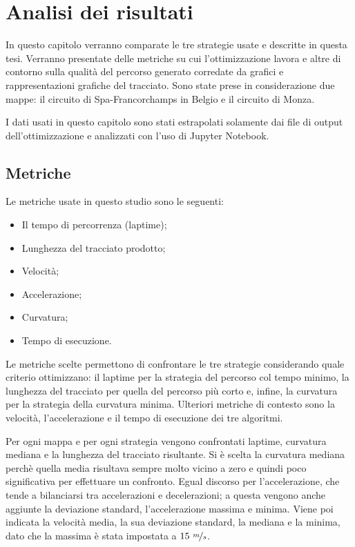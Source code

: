
\chapter{Analisi dei risultati}
In questo capitolo verranno comparate le tre strategie usate e descritte in questa tesi.
Verranno presentate delle metriche su cui l'ottimizzazione lavora e altre di contorno sulla
qualità del percorso generato corredate da grafici e rappresentazioni grafiche del tracciato.
Sono state prese in considerazione due mappe: il circuito di Spa-Francorchamps in Belgio e il circuito di
Monza.

I dati usati in questo capitolo sono stati estrapolati solamente dai file di output dell'ottimizzazione
e analizzati con l'uso di Jupyter Notebook.

\section{Metriche}
Le metriche usate in questo studio sono le seguenti:
\begin{itemize}
	\item Il tempo di percorrenza (laptime);
	\item Lunghezza del tracciato prodotto;
	\item Velocità; %
	\item Accelerazione; %
	\item Curvatura; %
	\item Tempo di esecuzione.
\end{itemize}
Le metriche scelte permettono di confrontare le tre strategie considerando quale criterio 
ottimizzano: il laptime per la strategia del percorso col tempo minimo, la lunghezza del tracciato per
quella del percorso più corto e, infine, la curvatura per la strategia della curvatura minima.
Ulteriori metriche di contesto sono la velocità, l'accelerazione e il tempo di esecuzione dei tre
algoritmi.

Per ogni mappa e per ogni strategia vengono confrontati laptime, curvatura mediana e la lunghezza del
tracciato risultante. Si è scelta la curvatura mediana perchè quella media risultava sempre molto
vicino a zero e quindi poco significativa per effettuare un confronto. Egual discorso per
l'accelerazione, che tende a bilanciarsi tra accelerazioni e decelerazioni; a questa vengono anche
aggiunte la deviazione standard, l'accelerazione massima e minima. Viene poi indicata la velocità media,
la sua deviazione standard, la mediana e la minima, dato che la massima è stata impostata a $15\
\nicefrac{m}{s}$.

